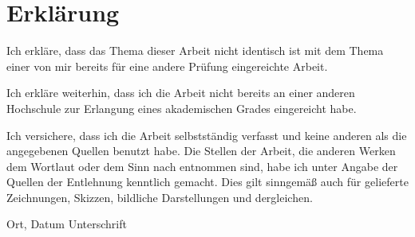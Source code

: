 \section*{Erklärung}

Ich erkläre, dass das Thema dieser Arbeit nicht identisch ist mit dem Thema einer von mir bereits für eine andere Prüfung eingereichte Arbeit.\par
Ich erkläre weiterhin, dass ich die Arbeit nicht bereits an einer anderen Hochschule zur Erlangung eines akademischen Grades eingereicht habe.\par
\vspace{2cm}
Ich versichere, dass ich die Arbeit selbstständig verfasst und keine anderen als die angegebenen Quellen benutzt habe.
Die Stellen der Arbeit, die anderen Werken dem Wortlaut oder dem Sinn nach entnommen sind, habe ich unter Angabe der Quellen der Entlehnung kenntlich gemacht.
Dies gilt sinngemäß auch für gelieferte Zeichnungen, Skizzen, bildliche Darstellungen und dergleichen.

\vfill

\hspace{2cm} Ort, Datum \hfill Unterschrift \hspace{2cm}